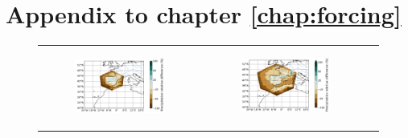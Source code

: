 \clearpage

\section*{Appendix to chapter \ref{chap:forcing}}

\begin{figure}[htbp]
    \centering
    \begin{tabular}{ccc}
        \begin{subfigure}[b]{0.33\textwidth}
            \caption{}
            \includegraphics[width=\textwidth]{images/chap4/domain_size/rel_diff_map_precip_era_LAM_1000km_NBP40.png}
        \end{subfigure} &
        \begin{subfigure}[b]{0.33\textwidth}
            \caption{}
            \includegraphics[width=\textwidth]{images/chap4/domain_size/rel_diff_map_precip_era_LAM_1500km_NBP60.png}

\end{subfigure}
\end{tabular}
\end{figure}
